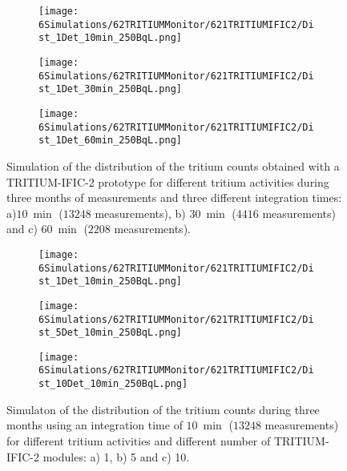 \begin{figure}
\centering
    \begin{subfigure}[b]{0.6\textwidth}
    \centering
    \texttt{[image: 6Simulations/62TRITIUMMonitor/621TRITIUMIFIC2/Dist\_1Det\_10min\_250BqL.png]}  
    \caption{\label{subfig:1Det10min250BqLST}}
    \end{subfigure}
    \hfill
    \begin{subfigure}[b]{0.6\textwidth}
    \centering
    \texttt{[image: 6Simulations/62TRITIUMMonitor/621TRITIUMIFIC2/Dist\_1Det\_30min\_250BqL.png]}  
    \caption{\label{subfig:1Det30min250BqLST}}
    \end{subfigure}
    \hfill
    \begin{subfigure}[b]{0.6\textwidth}
    \centering
    \texttt{[image: 6Simulations/62TRITIUMMonitor/621TRITIUMIFIC2/Dist\_1Det\_60min\_250BqL.png]}  
    \caption{\label{subfig:1Det60min250BqLST}}
    \end{subfigure}
 \caption{Simulation of the distribution of the tritium counts obtained with a TRITIUM-IFIC-2 prototype for different tritium activities during three months of measurements and three different integration times: a)$10~\min$ ($13248$ measurements), b) $30~\min$ ($4416$ measurements) and c) $60~\min$ ($2208$ measurements).}
 \label{fig:1Det250BqLseveralTimes}
\end{figure} 

\begin{figure}
\centering
    \begin{subfigure}[b]{0.6\textwidth}
    \centering
    \texttt{[image: 6Simulations/62TRITIUMMonitor/621TRITIUMIFIC2/Dist\_1Det\_10min\_250BqL.png]}  
    \caption{\label{subfig:1Det10min250BqLSD}}
    \end{subfigure}
    \hfill
    \begin{subfigure}[b]{0.6\textwidth}
    \centering
    \texttt{[image: 6Simulations/62TRITIUMMonitor/621TRITIUMIFIC2/Dist\_5Det\_10min\_250BqL.png]}  
    \caption{\label{subfig:5Det10min250BqLSD}}
    \end{subfigure}
    \hfill
    \begin{subfigure}[b]{0.6\textwidth}
    \centering
    \texttt{[image: 6Simulations/62TRITIUMMonitor/621TRITIUMIFIC2/Dist\_10Det\_10min\_250BqL.png]}  
    \caption{\label{subfig:10Det10min250BqLSD}}
    \end{subfigure}
 \caption{Simulaton of the distribution of the tritium counts during three months using an integration time of $10~\min$ ($13248$ measurements) for different tritium activities and different number of TRITIUM-IFIC-2 modules: a) 1, b) 5 and c) 10.}
 \label{fig:SeveralDet250BqL10min}
\end{figure}

